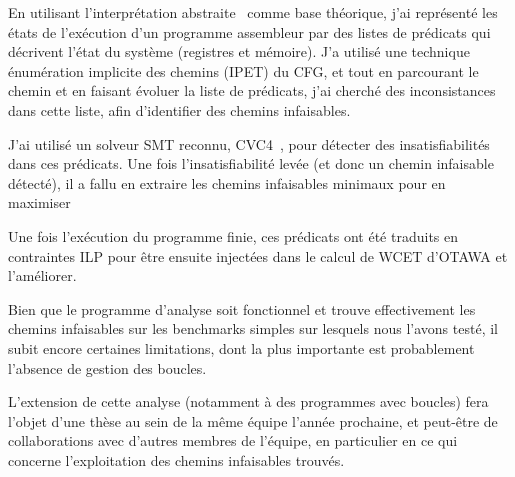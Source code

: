 \documentclass[french]{article}
\newcommand\ccc[1]{\color{red}{#1}\color{black}} %
\begin{document}
  En utilisant l'interprétation abstraite~\cite{cousot} comme base théorique, j'ai représenté les états de l'exécution d'un programme assembleur par des listes de prédicats qui décrivent l'état du système (registres et mémoire). J'a utilisé une technique énumération implicite des chemins (IPET) du CFG, et tout en parcourant le chemin et en faisant évoluer la liste de prédicats, j'ai cherché des inconsistances dans cette liste, afin d'identifier des chemins infaisables.

  J'ai utilisé un solveur SMT reconnu, CVC4~\cite{smt_cvc4}, pour détecter des insatisfiabilités dans ces prédicats. Une fois l'insatisfiabilité levée (et donc un chemin infaisable détecté), il a fallu en extraire les chemins infaisables minimaux pour en maximiser \ccc{l'exploitation. L'algorithme souffre notamment de l'absence de support du typage implicite des données en assembleur, et de celle de l'analyse des sous-programmes ; il faudrait également étendre le traitement de la mémoire (déjà bien avancé) aux tableaux.}

  Une fois l'exécution du programme finie, ces prédicats ont été traduits en contraintes ILP pour être ensuite injectées dans le calcul de WCET d'OTAWA et l'améliorer.

  Bien que le programme d'analyse soit fonctionnel et trouve effectivement les chemins infaisables sur les benchmarks simples sur lesquels nous l'avons testé, il subit encore certaines limitations, dont la plus importante est probablement l'absence de gestion des boucles.

  L'extension de cette analyse (notamment à des programmes avec boucles) fera l'objet d'une thèse au sein de la même équipe l'année prochaine, et peut-être de collaborations avec d'autres membres de l'équipe, en particulier en ce qui concerne l'exploitation des chemins infaisables trouvés.
\end{document}
